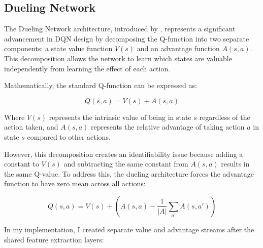 \documentclass[a4paper]{article}
\begin{document}
\subsection{Dueling Network}

The Dueling Network architecture, introduced by \cite{wang2016dueling}, represents a significant advancement in DQN design by decomposing the Q-function into two separate components: a state value function $V(s)$ and an advantage function $A(s,a)$. This decomposition allows the network to learn which states are valuable independently from learning the effect of each action.

Mathematically, the standard Q-function can be expressed as:

\begin{equation}
Q(s,a) = V(s) + A(s,a)
\end{equation}

Where $V(s)$ represents the intrinsic value of being in state $s$ regardless of the action taken, and $A(s,a)$ represents the relative advantage of taking action $a$ in state $s$ compared to other actions.

However, this decomposition creates an identifiability issue because adding a constant to $V(s)$ and subtracting the same constant from $A(s,a)$ results in the same Q-value. To address this, the dueling architecture forces the advantage function to have zero mean across all actions:

\begin{equation}
Q(s,a) = V(s) + \left(A(s,a) - \frac{1}{|A|}\sum_{a'}A(s,a')\right)
\end{equation}

In my implementation, I created separate value and advantage streams after the shared feature extraction layers:
\end{document}
